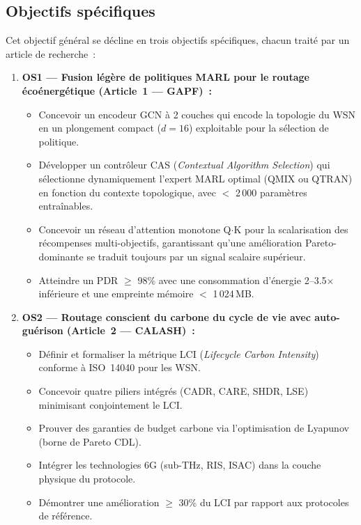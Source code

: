 \subsection{Objectifs spécifiques}

Cet objectif général se décline en trois objectifs spécifiques, chacun traité par un article de recherche~:

\begin{enumerate}
    \item \textbf{OS1 --- Fusion légère de politiques MARL pour le routage écoénergétique (Article~1 --- GAPF)~:}
    \begin{itemize}
        \item Concevoir un encodeur GCN à 2 couches qui encode la topologie du WSN en un plongement compact ($d = 16$) exploitable pour la sélection de politique.
        \item Développer un contrôleur CAS (\emph{Contextual Algorithm Selection}) qui sélectionne dynamiquement l'expert MARL optimal (QMIX ou QTRAN) en fonction du contexte topologique, avec $<$ 2\,000 paramètres entraînables.
        \item Concevoir un réseau d'attention monotone Q$\cdot$K pour la scalarisation des récompenses multi-objectifs, garantissant qu'une amélioration Pareto-dominante se traduit toujours par un signal scalaire supérieur.
        \item Atteindre un PDR $\geq$ 98\% avec une consommation d'énergie 2--3.5$\times$ inférieure et une empreinte mémoire $<$ 1\,024\,MB.
    \end{itemize}

    \item \textbf{OS2 --- Routage conscient du carbone du cycle de vie avec auto-guérison (Article~2 --- CALASH)~:}
    \begin{itemize}
        \item Définir et formaliser la métrique LCI (\emph{Lifecycle Carbon Intensity}) conforme à ISO~14040 pour les WSN.
        \item Concevoir quatre piliers intégrés (CADR, CARE, SHDR, LSE) minimisant conjointement le LCI.
        \item Prouver des garanties de budget carbone via l'optimisation de Lyapunov (borne de Pareto CDL).
        \item Intégrer les technologies 6G (sub-THz, RIS, ISAC) dans la couche physique du protocole.
        \item Démontrer une amélioration $\geq$ 30\% du LCI par rapport aux protocoles de référence.
    \end{itemize}


\end{enumerate}
